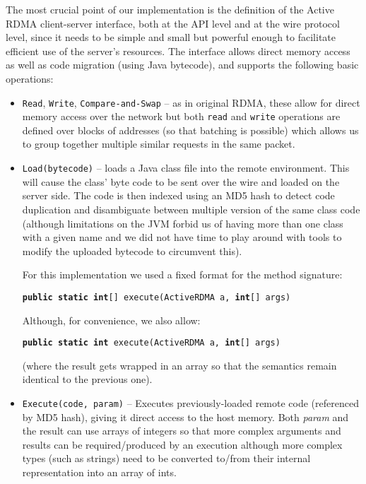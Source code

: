 \documentclass[10pt]{article}
\begin{document}
The most crucial point of our implementation is the definition of the Active RDMA client-server interface, both at the API level and at the wire protocol level, since it needs to be simple and small but powerful enough to facilitate efficient use of the server's resources. The interface allows direct memory
  access as well as code migration (using Java bytecode), and supports
  the following basic operations:
  \begin{itemize}
  \item {\tt Read}, {\tt Write}, {\tt Compare-and-Swap} -- as in original RDMA, these
    allow for direct memory access over the network but both {\tt read}
    and {\tt write} operations are defined over blocks of addresses (so
    that batching is possible) which allows us to group together multiple similar requests in the same packet.
  \item {\tt Load(bytecode)} -- loads a Java class file into the remote
    environment. This will cause the class' byte code to be sent over the wire and loaded on the server side. The code is then indexed using an MD5 hash to detect code duplication and disambiguate between multiple version of the same class code (although limitations on the JVM forbid us of having more than one class with a given name and we did not have time to play around with tools to modify the uploaded bytecode to circumvent this). 
    
    For this implementation we used a fixed format for the method signature:
    
    {\tt \textbf{public static int}[] execute(ActiveRDMA a, \textbf{int}[] args)}

Although, for convenience, we also allow:

    {\tt \textbf{public static int} execute(ActiveRDMA a, \textbf{int}[] args)}

(where the result gets wrapped in an array so that the semantics remain identical to the previous one).

  \item {\tt Execute(code, param)} -- Executes previously-loaded remote code
    (referenced by MD5 hash), giving it direct access to the host
    memory. Both \textit{param} and the result can use arrays of integers so that more complex arguments and results can be required/produced by an execution although more complex types (such as strings) need to be converted to/from their internal representation into an array of ints.
     
  \end{itemize}
  
\end{document}
